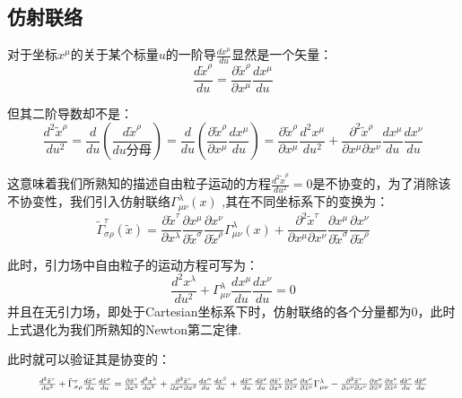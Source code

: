 \documentclass[a4paper]{book}
\begin{document}
\begin{appendix}
\section{仿射联络}
对于坐标$x^{\mu}$的关于某个标量$u$的一阶导$\frac{dx^{\mu}}{du}$显然是一个矢量：
\begin{equation}
	\frac{d\tilde{x}^{\rho}}{du}=\frac{\partial \tilde{x}^{\rho}}{\partial x^{\mu}}\frac{dx^{\mu}}{du}
\end{equation}\par 
但其二阶导数却不是：
\begin{equation}
	\frac{d^2 \tilde{x}^{\rho}}{du^2}=\frac{d}{du}(\frac{d\tilde{x}^{\rho}}{du分母})=\frac{d}{du}(\frac{\partial \tilde{x}^{\rho}}{\partial x^{\mu}}\frac{dx^{\mu}}{du})=\frac{\partial \tilde{x}^{\rho}}{\partial x^{\mu}}\frac{d^2 x^{\mu}}{du^2}+\frac{\partial^2 \tilde{x}^\rho}{\partial x^{\mu} \partial x^{\nu}}\frac{dx^{\mu}}{du}\frac{dx^{\nu}}{du}
\end{equation}\par
这意味着我们所熟知的描述自由粒子运动的方程$\frac{d^2 \tilde{x}^{\rho}}{du^2}=0$是不协变的，为了消除该不协变性，我们引入仿射联络$\Gamma^{\lambda}_{\mu \nu}(x)$
,其在不同坐标系下的变换为：
\begin{equation}
	\tilde{\Gamma}_{\sigma \rho}^{\tau}\left(\tilde{x}\right)=\frac{\partial\tilde{x}^{\tau}}{\partial x^{\lambda}}\frac{\partial x^{\mu}}{\partial\tilde{x}^{\sigma}}\frac{\partial x^{\nu}}{\partial\tilde{x}^{\rho}}\Gamma_{\mu\nu}^{\lambda}\left(x\right)+\frac{\partial^{2}\tilde{x}^{\tau}}{\partial x^{\mu}\partial x^{\nu}} \frac{\partial x^{\mu}}{\partial \tilde{x}^{\sigma}}\frac{\partial x^{\nu}}{\partial \tilde{x}^{\rho}}
\end{equation} \par 
此时，引力场中自由粒子的运动方程可写为：
\begin{equation}\label{A.17}
	\frac{d^2 x^{\lambda}}{du^2}+\Gamma^{\lambda}_{\mu \nu}\frac{dx^{\mu}}{du}\frac{dx^{\nu}}{du}=0
\end{equation}
并且在无引力场，即处于Cartesian坐标系下时，仿射联络的各个分量都为0，此时上式退化为我们所熟知的Newton第二定律. \par 
此时就可以验证其是协变的：
\begin{equation}
	\resizebox{.9\hsize}{!}{$\frac{d^2 \tilde{x}^{\tau}}{du^2}+\tilde{\Gamma}^{\tau}_{\sigma \rho}\frac{d\tilde{x}^{\sigma}}{du}\frac{d\tilde{x}^{\rho}}{du}= \frac{\partial \tilde{x}^{\tau}}{\partial x^{\lambda}}\frac{d^2   x^{\lambda}}{du^2}+\frac{\partial^2 \tilde{x}^{\tau}}{\partial x^{\alpha}\partial x^{\beta}}\frac{dx^{\alpha}}{du}\frac{dx^{\beta}}{du}+\frac{d\tilde{x}^{\sigma}}{du}\frac{d\tilde{x}^{\rho}}{du}\frac{\partial \tilde{x}^{\tau}}{\partial x^{\lambda}}\frac{\partial x^{\mu}}{\partial \tilde{x}^{\sigma}}\frac{\partial x^{\nu}}{\partial \tilde{x}^{\rho}}\Gamma^{\lambda}_{\mu \nu}-\frac{\partial^2 \tilde{x}^{\tau}}{\partial x^{\mu}\partial x^{\nu}}\frac{\partial x^{\mu}}{\partial \tilde{x}^{\sigma}}\frac{\partial x^{\nu}}{\partial \tilde{x}^{\rho}}\frac{d\tilde{x}^{\sigma}}{du}\frac{d\tilde{x}^{\rho}}{du} \notag$} %

\end{equation}
\end{appendix}
\end{document}
